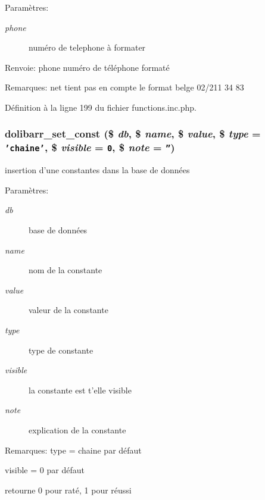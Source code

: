 \begin{Desc}
\item[Param\`{e}tres:]
\begin{description}
\item[{\em phone}]num\'{e}ro de telephone \`{a} formater \end{description}
\end{Desc}
\begin{Desc}
\item[Renvoie:]phone num\'{e}ro de t\'{e}l\'{e}phone format\'{e} \end{Desc}
\begin{Desc}
\item[Remarques:]net tient pas en compte le format belge 02/211 34 83 \end{Desc}


D\'{e}finition \`{a} la ligne 199 du fichier functions.inc.php.\hypertarget{functions_8inc_8php_a3}{
\subsubsection[dolibarr\_\-set\_\-const]{\setlength{\rightskip}{0pt plus 5cm}dolibarr\_\-set\_\-const (\$ {\em db}, \$ {\em name}, \$ {\em value}, \$ {\em type} = {\tt 'chaine'}, \$ {\em visible} = {\tt 0}, \$ {\em note} = {\tt ''})}}
\label{functions_8inc_8php_a3}


insertion d'une constantes dans la base de donn\'{e}es 

\begin{Desc}
\item[Param\`{e}tres:]
\begin{description}
\item[{\em db}]base de donn\'{e}es \item[{\em name}]nom de la constante \item[{\em value}]valeur de la constante \item[{\em type}]type de constante \item[{\em visible}]la constante est t'elle visible \item[{\em note}]explication de la constante \end{description}
\end{Desc}
\begin{Desc}
\item[Remarques:]type = chaine par d\'{e}faut 

visible = 0 par d\'{e}faut 

retourne 0 pour rat\'{e}, 1 pour r\'{e}ussi \end{Desc}


